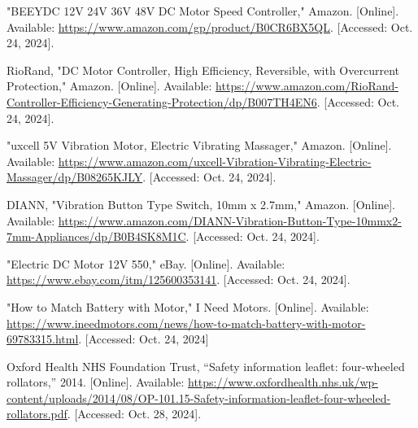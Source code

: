 \begin{thebibliography}{45}
	"BEEYDC 12V 24V 36V 48V DC Motor Speed Controller," Amazon. [Online]. Available: \url{https://www.amazon.com/gp/product/B0CR6BX5QL}. [Accessed: Oct. 24, 2024]. 
	
	RioRand, "DC Motor Controller, High Efficiency, Reversible, with Overcurrent Protection," Amazon. [Online]. Available: \url{https://www.amazon.com/RioRand-Controller-Efficiency-Generating-Protection/dp/B007TH4EN6}. [Accessed: Oct. 24, 2024]. 
	
	"uxcell 5V Vibration Motor, Electric Vibrating Massager," Amazon. [Online]. Available: \url{https://www.amazon.com/uxcell-Vibration-Vibrating-Electric-Massager/dp/B08265KJLY}. [Accessed: Oct. 24, 2024]. 
	
	DIANN, "Vibration Button Type Switch, 10mm x 2.7mm," Amazon. [Online]. Available: \url{https://www.amazon.com/DIANN-Vibration-Button-Type-10mmx2-7mm-Appliances/dp/B0B4SK8M1C}. [Accessed: Oct. 24, 2024]. 
	
	"Electric DC Motor 12V 550," eBay. [Online]. Available: \url{https://www.ebay.com/itm/125600353141}. [Accessed: Oct. 24, 2024]. 
	
	"How to Match Battery with Motor," I Need Motors. [Online]. Available: \url{https://www.ineedmotors.com/news/how-to-match-battery-with-motor-69783315.html}. [Accessed: Oct. 24, 2024]
	
	
	Oxford Health NHS Foundation Trust, ``Safety information leaflet: four-wheeled rollators,'' 2014. [Online]. Available: \url{https://www.oxfordhealth.nhs.uk/wp-content/uploads/2014/08/OP-101.15-Safety-information-leaflet-four-wheeled-rollators.pdf}. [Accessed: Oct. 28, 2024].
		 
	
\end{thebibliography}
